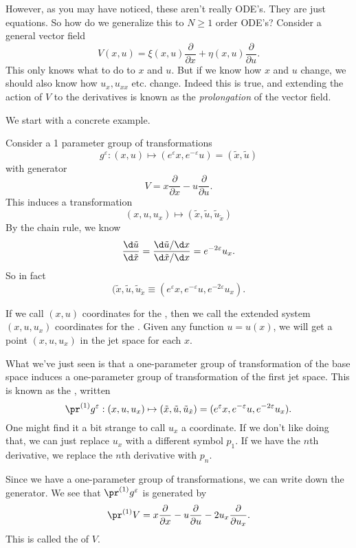 \documentclass[a4paper]{article}
\begin{document}
However, as you may have noticed, these aren't really ODE's. They are just equations. So how do we generalize this to $N \geq 1$ order ODE's? Consider a general vector field
\[
  V(x, u) = \xi(x, u) \frac{\partial}{\partial x} + \eta(x, u) \frac{\partial}{\partial u}.
\]
This only knows what to do to $x$ and $u$. But if we know how $x$ and $u$ change, we should also know how $u_x, u_{xx}$ etc. change. Indeed this is true, and extending the action of $V$ to the derivatives is known as the \emph{prolongation} of the vector field.

We start with a concrete example.

\begin{eg}
  Consider a 1 parameter group of transformations
  \[
    g^\varepsilon: (x, u) \mapsto (e^\varepsilon x, e^{-\varepsilon}u) = (\tilde{x}, \tilde{u})
  \]
  with generator
  \[
    V = x\frac{\partial}{\partial x} - u\frac{\partial}{\partial u}.
  \]
  This induces a transformation
  \[
    (x, u, u_x) \mapsto (\tilde{x}, \tilde{u}, \tilde{u}_{\tilde{x}})
  \]
  By the chain rule, we know
  \[
    \frac{\d \tilde{u}}{\d \tilde{x}} = \frac{\d\tilde{u}/\d x}{\d \tilde{x}/\d x} = e^{-2 \varepsilon} u_x.
  \]
  So in fact
  \[
    (\tilde{x}, \tilde{u}, \tilde{u}_{\tilde{x}} \equiv (e^\varepsilon x, e^{-\varepsilon} u, e^{-2\varepsilon} u_x).
  \]
\end{eg}

If we call $(x, u)$ coordinates for the , then we call the extended system $(x, u, u_x)$ coordinates for the . Given any function $u = u(x)$, we will get a point $(x, u, u_x)$ in the jet space for each $x$.

What we've just seen is that a one-parameter group of transformation of the base space induces a one-parameter group of transformation of the first jet space. This is known as the , written
\[
  \pr^{(1)}g^\varepsilon: (x, u, u_x) \mapsto (\tilde{x}, \tilde{u}, \tilde{u}_{\tilde{x}}) = (e^\varepsilon x, e^{-\varepsilon} u, e^{-2\varepsilon} u_x).
\]
One might find it a bit strange to call $u_x$ a coordinate. If we don't like doing that, we can just replace $u_x$ with a different symbol $p_1$. If we have the $n$th derivative, we replace the $n$th derivative with $p_n$.

Since we have a one-parameter group of transformations, we can write down the generator. We see that $\pr^{(1)}g^\varepsilon$ is generated by
\[
  \pr^{(1)} V = x\frac{\partial}{\partial x} - u \frac{\partial}{\partial u} - 2 u_x \frac{\partial}{\partial u_x}.
\]
This is called the  of $V$.
\end{document}
